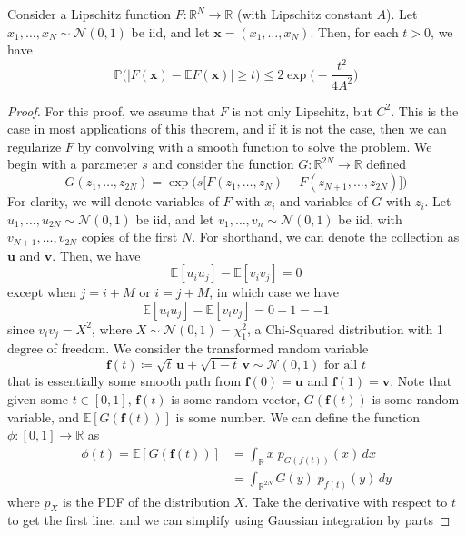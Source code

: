 \documentclass{article}
\begin{document}
\begin{theorem}
Consider a Lipschitz function $F: \mathbb{R}^N \longrightarrow \mathbb{R}$ (with Lipschitz constant $A$). Let $x_1, \ldots, x_N \sim \mathcal{N}(0, 1)$ be iid, and let $\mathbf{x} = (x_1, \ldots, x_N)$. Then, for each $t > 0$, we have 
\[\mathbb{P} \big( | F(\mathbf{x}) - \mathbb{E} F(\mathbf{x}) | \geq t \big) \leq 2 \exp \bigg(- \frac{t^2}{4A^2} \bigg)\]
\end{theorem}
\begin{proof}
For this proof, we assume that $F$ is not only Lipschitz, but $C^2$. This is the case in most applications of this theorem, and if it is not the case, then we can regularize $F$ by convolving with a smooth function to solve the problem. We begin with a parameter $s$ and consider the function $G: \mathbb{R}^{2N} \longrightarrow \mathbb{R}$ defined 
\[G(z_1, \ldots, z_{2N}) = \exp \Big( s \big[ F ( z_1, \ldots, z_N) - F(z_{N+1}, \ldots, z_{2N}) \big] \Big)\]
For clarity, we will denote variables of $F$ with $x_i$ and variables of $G$ with $z_i$. Let $u_1, \ldots, u_{2N} \sim \mathcal{N}(0, 1)$ be iid, and let $v_1, \ldots, v_n \sim \mathcal{N}(0, 1)$ be iid, with $v_{N+1}, \ldots, v_{2N}$ copies of the first $N$. For shorthand, we can denote the collection as $\mathbf{u}$ and $\mathbf{v}$. Then, we have 
\[\mathbb{E} [u_i u_j] - \mathbb{E}[ v_i v_j] = 0\]
except when $j = i + M$ or $i = j + M$, in which case we have 
\[\mathbb{E} [u_i u_j] - \mathbb{E}[ v_i v_j] = 0 - 1 = -1\]
since $v_i v_j = X^2$, where $X \sim \mathcal{N}(0, 1) = \chi^2_1$, a Chi-Squared distribution with 1 degree of freedom. We consider the transformed random variable
\[\mathbf{f}(t) \coloneqq \sqrt{t} \, \mathbf{u} + \sqrt{1 - t} \, \mathbf{v} \sim \mathcal{N}(0, 1) \text{ for all } t\]
that is essentially some smooth path from $\mathbf{f}(0) = \mathbf{u}$ and $\mathbf{f}(1) = \mathbf{v}$. Note that given some $t \in [0, 1]$, $\mathbf{f}(t)$ is some random vector, $G ( \mathbf{f}(t))$ is some random variable, and $\mathbb{E}[ G(\mathbf{f}(t))]$ is some number. We can define the function $\phi: [0, 1] \longrightarrow \mathbb{R}$ as 
\begin{align*}
    \phi(t) = \mathbb{E} [G (\mathbf{f}(t))] & = \int_\mathbb{R} x \; p_{G(f(t))} (x) \,dx \\
    & = \int_{\mathbb{R}^{2N}} G(y) \; p_{f(t)} (y) \,dy 
\end{align*}
where $p_X$ is the PDF of the distribution $X$. Take the derivative with respect to $t$ to get the first line, and we can simplify using Gaussian integration by parts 

\end{proof}
\end{document}
